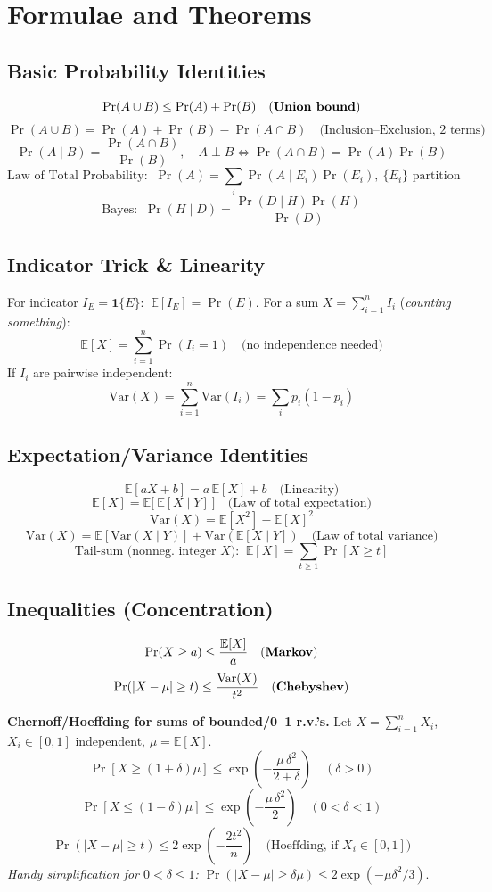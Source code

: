\documentclass[10pt]{article}
\theoremstyle{definition}
\begin{document}
\bigskip


\section{Formulae and Theorems}
\subsection{Basic Probability Identities}
\[
\Pr(A\cup B)\le \Pr(A)+\Pr(B)\quad\text{(\textbf{Union bound})}
\]
\[
\Pr(A\cup B)=\Pr(A)+\Pr(B)-\Pr(A\cap B)\quad\text{(Inclusion--Exclusion, 2 terms)}
\]
\[
\Pr(A\mid B)=\frac{\Pr(A\cap B)}{\Pr(B)},\quad A\perp B\iff \Pr(A\cap B)=\Pr(A)\Pr(B)
\]
\[
\text{Law of Total Probability: }\ \Pr(A)=\sum_i \Pr(A\mid E_i)\Pr(E_i),\ \{E_i\}\text{ partition}
\]
\[
\text{Bayes: }\ \Pr(H\mid D)=\frac{\Pr(D\mid H)\Pr(H)}{\Pr(D)}
\]

\subsection{Indicator Trick \& Linearity}
For indicator $I_E=\mathbf{1}\{E\}$: $\ \mathbb{E}[I_E]=\Pr(E)$.
For a sum $X=\sum_{i=1}^n I_i$ (\emph{counting something}):
\[
\mathbb{E}[X]=\sum_{i=1}^n \Pr(I_i=1)\quad\text{(no independence needed)}
\]
If $I_i$ are pairwise independent: 
\[
\mathrm{Var}(X)=\sum_{i=1}^n \mathrm{Var}(I_i)=\sum_i p_i(1-p_i)
\]

\subsection{Expectation/Variance Identities}
\[
\mathbb{E}[aX+b]=a\,\mathbb{E}[X]+b\quad\text{(Linearity)}
\]
\[
\mathbb{E}[X]=\mathbb{E}\big[\ \mathbb{E}[X\mid Y]\ \big]\quad\text{(Law of total expectation)}
\]
\[
\mathrm{Var}(X)=\mathbb{E}[X^2]-\mathbb{E}[X]^2
\]
\[
\mathrm{Var}(X)=\mathbb{E}\!\left[\mathrm{Var}(X\mid Y)\right]+\mathrm{Var}\!\left(\mathbb{E}[X\mid Y]\right)\quad\text{(Law of total variance)}
\]
\[
\text{Tail-sum (nonneg. integer $X$): }\ \mathbb{E}[X]=\sum_{t\ge1}\Pr[X\ge t]
\]

\subsection{Inequalities (Concentration)}
\[
\Pr(X\ge a)\le \frac{\mathbb{E}[X]}{a}\quad\text{(\textbf{Markov})}
\]
\[
\Pr(|X-\mu|\ge t)\le \frac{\mathrm{Var}(X)}{t^2}\quad\text{(\textbf{Chebyshev})}
\]

\noindent\textbf{Chernoff/Hoeffding for sums of bounded/0--1 r.v.'s.} Let $X=\sum_{i=1}^n X_i$, $X_i\in[0,1]$ independent, $\mu=\mathbb{E}[X]$.
\[
\Pr\!\left[X\ge (1+\delta)\mu\right]\le \exp\!\left(-\frac{\mu\,\delta^2}{2+\delta}\right)\quad(\delta>0)
\]
\[
\Pr\!\left[X\le (1-\delta)\mu\right]\le \exp\!\left(-\frac{\mu\,\delta^2}{2}\right)\quad(0<\delta<1)
\]
\[
\Pr(|X-\mu|\ge t)\le 2\exp\!\left(-\frac{2t^2}{n}\right)\quad\text{(Hoeffding, if $X_i\in[0,1]$)}
\]
\emph{Handy simplification for $0<\delta\le1$: } $\Pr(|X-\mu|\ge \delta\mu)\le 2\exp(-\mu\delta^2/3)$.
\end{document}
